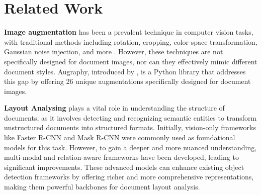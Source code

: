 \section{Related Work}
\textbf{Image augmentation} has been a prevalent technique in computer vision tasks, with traditional methods including rotation, cropping, color space transformation, Gaussian noise injection, and more \cite{shorten2019survey}. However, these techniques are not specifically designed for document images, nor can they effectively mimic different document styles. Augraphy, introduced by \cite{groleau2023augraphy}, is a Python library that addresses this gap by offering 26 unique augmentations specifically designed for document images.

\textbf{Layout Analysing} plays a vital role in understanding the structure of documents, as it involves detecting and recognizing semantic entities to transform unstructured documents into structured formats. Initially, vision-only frameworks like Faster R-CNN \cite{ren2015faster} and Mask R-CNN \cite{he2017mask} were commonly used as foundational models for this task. However, to gain a deeper and more nuanced understanding, multi-modal \cite{huang2022layoutlmv3} and relation-aware \cite{luo2022doc} frameworks have been developed, leading to significant improvements. These advanced models can enhance existing object detection frameworks by offering richer and more comprehensive representations, making them powerful backbones for document layout analysis.